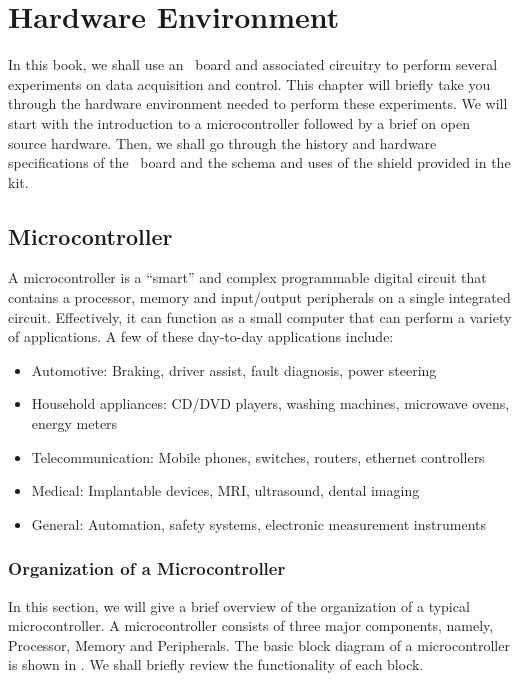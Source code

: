 \chapter{Hardware Environment}
\thispagestyle{empty}
\label{sec:hw-env}
\newcommand{\LocHWfig}{\Origin/user-code/hw-env/figures}
\newcommand{\LocHWscicode}{\Origin/user-code/hw-env/scilab}
\newcommand{\LocHWscibrief}{Origin/user-code/hw-env/scilab}
\newcommand{\LocHWardcode}{\Origin/user-code/hw-env/arduino}
\newcommand{\LocHWardbrief}{\tt Origin/user-code/hw-env/arduino}
\newcommand{\LocSH}{\Origin/tools/shield}
\newcommand{\LocSHbrief}[1]{{\tt Origin/tools/shield/#1}, see \fnrefp{fn:file-loc}}

In this book, we shall use an \arduino\ board and associated circuitry
to perform several experiments on data acquisition and control. This
chapter will briefly take you through the hardware environment needed
to perform these experiments. We will start with the introduction to a
microcontroller followed by a brief on open source hardware. Then, we
shall go through the history and hardware specifications of the
\arduino\ board and the schema and uses of the shield provided in
the kit.


\section{Microcontroller}
A microcontroller is a ``smart'' and complex programmable digital circuit
that contains a processor, memory and input/output peripherals on a
single integrated circuit. Effectively, it can function as a small
computer that can perform a variety of applications. A few of these
day-to-day applications include:
\begin{itemize}
  \item Automotive: Braking, driver assist, fault diagnosis, power
        steering
  \item Household appliances: CD/DVD players, washing machines,
        microwave ovens, energy meters
  \item Telecommunication: Mobile phones, switches, routers, ethernet
        controllers
  \item Medical: Implantable devices, MRI, ultrasound, dental imaging
  \item General: Automation, safety systems, electronic measurement
        instruments
\end{itemize}

\subsection{Organization of a Microcontroller}
In this section, we will give a brief overview of the organization of
a typical microcontroller.  A microcontroller consists of three major
components, namely, Processor, Memory and Peripherals. The basic block
diagram of a microcontroller is shown in . We shall
briefly review the functionality of each block.

